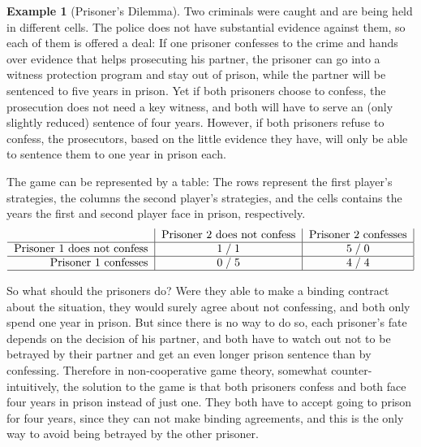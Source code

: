 \documentclass[a4paper]{scrreprt}
\theoremstyle{definition}
\newtheorem{ex}[thm]{Example} %
\begin{document}
    \begin{ex}[Prisoner's Dilemma]
        Two criminals were caught and are being held in different cells. The police does not have substantial evidence against them, so each of them is offered a deal: If one prisoner confesses to the crime and hands over evidence that helps prosecuting his partner, the prisoner can go into a witness protection program and stay out of prison, while the partner will be sentenced to five years in prison. Yet if both prisoners choose to confess, the prosecution does not need a key witness, and both will have to serve an (only slightly reduced) sentence of four years. However, if both prisoners refuse to confess, the prosecutors, based on the little evidence they have, will only be able to sentence them to one year in prison each.
        
        The game can be represented by a table: 
        The rows represent the first player's strategies, the columns the second player's strategies,  and the cells contains the years the first and second player face in prison, respectively.
        \begin{gather*}
            \centering
            \begin{tabular}{r|c|c|}
            	                    & Prisoner 2 does not confess & Prisoner 2 confesses \\ \hline
            	Prisoner 1 does not confess &       1\;/\;1       &   5\;/\;0    \\ \hline
            	   Prisoner 1 confesses     &       0\;/\;5       &   4\;/\;4    \\ \hline
            \end{tabular}
        \end{gather*}
    
        
        So what should the prisoners do?
        Were they able to make a binding contract about the situation, they would surely agree about not confessing, and both only spend one year in prison. But since there is no way to do so, each prisoner's fate depends on the decision of his partner, and both have to watch out not to be betrayed by their partner and get an even longer prison sentence than by confessing.
        Therefore in non-cooperative game theory, somewhat counter-intuitively, the solution to the game is that both prisoners confess and both face four years in prison instead of just one.
        They both have to accept going to prison for four years, since they can not make binding agreements, and this is the only way to avoid being betrayed by the other prisoner.
        \label{ex:prisonersDilemma}
        \label{ex:gameTheoryIntroductoryExample}
    \end{ex}
\end{document}
